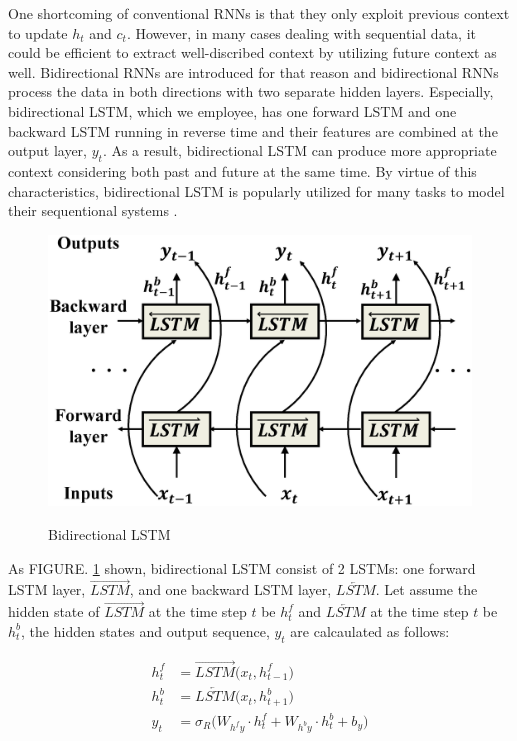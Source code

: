 \documentclass{ieeeaccess}
\begin{document}
One shortcoming of conventional RNNs is that they only exploit previous context to update $h_{t}$ and $c_{t}$. However, in many cases dealing with sequential data, it could be efficient to extract well-discribed context by utilizing future context as well. Bidirectional RNNs are introduced\cite{schuster1997bidirectional} for that reason and bidirectional RNNs process the data in both directions with two separate hidden layers. Especially, bidirectional LSTM, which we employee, has one forward LSTM and one backward LSTM running in reverse time and their features are combined at the output layer, $y_{t}$. As a result, bidirectional LSTM can produce more appropriate context considering both past and future at the same time. By virtue of this characteristics, bidirectional LSTM is popularly utilized for many tasks to model their sequentional systems \cite{zhang2017multi,li2018human,ullah2018action}. 

\begin{figure}[h!]
	\centering
	\includegraphics[width=.9\linewidth]{bidirectional_LSTM_revised}
	\label{fig:bidirectional_revised} 	
	\caption{Bidirectional LSTM}
\end{figure}

As FIGURE. \textcolor{red}{\ref{fig:bidirectional_revised}} shown, bidirectional LSTM consist of 2 LSTMs: one forward LSTM layer, $\overrightarrow{LSTM}$, and one backward LSTM layer, $\overleftarrow{LSTM}$. Let assume the hidden state of $\overrightarrow{LSTM}$ at the time step $t$  be $h^{f}_{t}$ and $\overleftarrow{LSTM}$ at the time step $t$  be $h^{b}_{t}$, the hidden states and output sequence, $y_{t}$ are calcaulated as follows:

\begin{align}
h^{f}_{t} & =\overrightarrow{LSTM}\big(x_{t}, h^{f}_{t-1}\big)\\
h^{b}_{t} & =\overleftarrow{LSTM}\big(x_{t}, h^{b}_{t+1}\big)\\
y_{t} & =\sigma _{R}\big(W_{h^{f}y}\cdot h^{f}_{t}+W_{h^{b}y}\cdot h^{b}_{t}+b_{y}\big)
\end{align}
\end{document}
